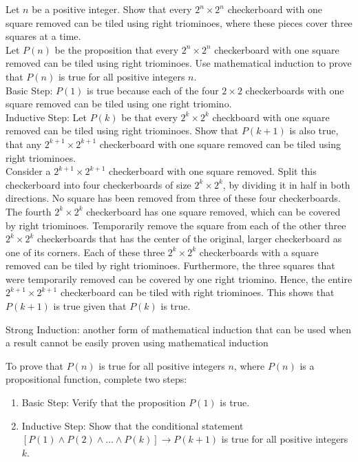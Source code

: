 \documentclass[12pt]{article}
\begin{document}
\begin{example} Let $n$ be a positive integer. Show that every $2^n \times 2^n$ checkerboard with one square removed can be tiled using right triominoes, where these pieces cover three squares at a time. \\ 
Let $P(n)$ be the proposition that every $2^n \times 2^n$ checkerboard with one square removed can be tiled using right triominoes. Use mathematical induction to prove that $P(n)$ is true for all positive integers $n$. \\ 
Basic Step: $P(1)$ is true because each of the four $2 \times 2$ checkerboards with one square removed can be tiled using one right triomino. \\
Inductive Step: Let $P(k)$ be that every $2^k \times 2^k$ checkboard with one square removed can be tiled using right triominoes. Show that $P(k + 1)$ is also true, that any $2^{k + 1} \times 2^{k + 1}$ checkerboard with one square removed can be tiled using right triominoes. \\ Consider a $2^{k + 1} \times 2^{k + 1}$ checkerboard with one square removed. Split this checkerboard into four checkerboards of size $2^k \times 2^k$, by dividing it in half in both directions. No square has been removed from three of these four checkerboards. The fourth $2^k \times 2^k$ checkerboard has one square removed, which can be covered by right triominoes. Temporarily remove the square from each of the other three $2^k \times 2^k$ checkerboards that has the center of the original, larger checkerboard as one of its corners. Each of these three $2^k \times 2^k$ checkerboards with a square removed can be tiled by right triominoes. Furthermore, the three squares that were temporarily removed can be covered by one right triomino. Hence, the entire $2^{k + 1} \times 2^{k + 1}$ checkerboard can be tiled with right triominoes. This shows that $P(k + 1)$ is true given that $P(k)$ is true. \end{example} 

\begin{definition} Strong Induction: another form of mathematical induction that can be used when a result cannot be easily proven using mathematical induction \end{definition} 
To prove that $P(n)$ is true for all positive integers $n$, where $P(n)$ is a propositional function, complete two steps: \begin{enumerate} 
\item Basic Step: Verify that the proposition $P(1)$ is true. 
\item Inductive Step: Show that the conditional statement $[P(1) \wedge P(2) \wedge \dots \wedge P(k)] \to P(k + 1)$ is true for all positive integers $k$. \end{enumerate} 
\end{document}
